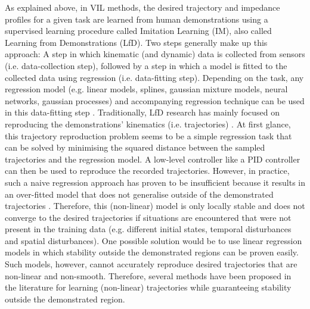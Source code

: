 As explained above, in VIL methods, the desired trajectory and impedance profiles for a given task are learned from human demonstrations using a supervised learning procedure called Imitation Learning (IM), also called Learning from Demonstrations (LfD). Two steps generally make up this approach: A step in which kinematic (and dynamic) data is collected from sensors (i.e. data-collection step), followed by a step in which a model is fitted to the collected data using regression (i.e. data-fitting step). Depending on the task, any regression model (e.g. linear models, splines, gaussian mixture models, neural networks, gaussian processes) and accompanying regression technique can be used in this data-fitting step \cite{kroemerReviewRobotLearning2021,husseinImitationLearningSurvey2017}. Traditionally, LfD research has mainly focused on reproducing the demonstrations' kinematics (i.e. trajectories) \cite{siReviewManipulationSkill2021}. At first glance, this trajectory reproduction problem seems to be a simple regression task that can be solved by minimising the squared distance between the sampled trajectories and the regression model. A low-level controller like a PID controller can then be used to reproduce the recorded trajectories. However, in practice, such a naive regression approach has proven to be insufficient because it results in an over-fitted model that does not generalise outside of the demonstrated trajectories \cite{sindhwaniLearningContractingVector2018}. Therefore, this (non-linear) model is only locally stable and does not converge to the desired trajectories if situations are encountered that were not present in the training data (e.g. different initial states, temporal disturbances and spatial disturbances). One possible solution would be to use linear regression models in which stability outside the demonstrated regions can be proven easily. Such models, however, cannot accurately reproduce desired trajectories that are non-linear and non-smooth. Therefore, several methods have been proposed in the literature for learning (non-linear) trajectories while guaranteeing stability outside the demonstrated region.

